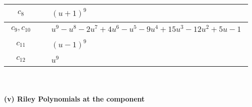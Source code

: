 \documentclass[1p]{elsarticle_modified}
\theoremstyle{definition}
\begin{document}
\begin{tabular}{m{50pt}|m{274pt}}
\hline $$\begin{aligned}c_{8}\end{aligned}$$&$\begin{aligned}
&(u+1)^9
\end{aligned}$\\
\hline $$\begin{aligned}c_{9},c_{10}\end{aligned}$$&$\begin{aligned}
&u^9- u^8-2 u^7+4 u^6- u^5-9 u^4+15 u^3-12 u^2+5 u-1
\end{aligned}$\\
\hline $$\begin{aligned}c_{11}\end{aligned}$$&$\begin{aligned}
&(u-1)^9
\end{aligned}$\\
\hline $$\begin{aligned}c_{12}\end{aligned}$$&$\begin{aligned}
&u^9
\end{aligned}$\\
\hline
\end{tabular}\\~\\
\newpage\renewcommand{\arraystretch}{1}
\flushleft \textbf{(v) Riley Polynomials at the component}\newline \\
\end{document}
